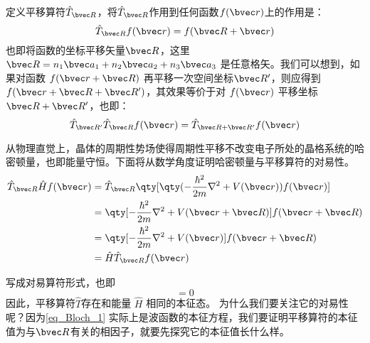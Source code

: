 定义平移算符$\hat{T}_{\bvec R}$，将$\hat{T}_{\bvec R}$作用到任何函数$f(\bvec r)$上的作用是：
\begin{equation}
\hat{T}_{\bvec R} f(\bvec r) = f(\bvec R + \bvec r)
\end{equation}
也即将函数的坐标平移矢量$\bvec R$，这里$\bvec R = n_1 \bvec a_1 + n_2 \bvec a_2 + n_3 \bvec a_3 $ 是任意格矢。我们可以想到，如果对函数 $f(\bvec r + \bvec R)$ 再平移一次空间坐标$\bvec R'$，则应得到$f(\bvec r + \bvec R + \bvec R')$，其效果等价于对 $f(\bvec r)$ 平移坐标$\bvec R + \bvec R'$，也即：
\begin{equation}
\hat{T}_{\bvec R'}\hat{T}_{\bvec R} f(\bvec r) = \hat{T}_{\bvec R + \bvec R'}f(\bvec r )
\end{equation}

从物理直觉上，晶体的周期性势场使得周期性平移不改变电子所处的晶格系统的哈密顿量，也即能量守恒。下面将从数学角度证明哈密顿量与平移算符的对易性。
\begin{equation}
\begin{aligned}
\hat{T}_{\bvec R} \hat{H} f(\bvec r) &= \hat{T}_{\bvec R} \qty[\qty(-\frac{\hbar^2}{2m}\nabla^2+V(\bvec r) ) f(\bvec r)] \\
&= \qty[-\frac{\hbar^2}{2m}\nabla^2+V(\bvec r + \bvec R)]  f(\bvec r + \bvec R)\\
&= \qty[-\frac{\hbar^2}{2m}\nabla^2+V(\bvec r) ] f(\bvec r+ \bvec R)\\
& = \hat{H} \hat{T}_{\bvec R} f(\bvec r)
\end{aligned}
\end{equation}

写成对易算符形式，也即
\begin{equation}
[\hat{T},\hat{H}] = 0
\end{equation}
因此，平移算符$\hat{T}$存在和能量 $\hat{H}$ 相同的本征态。
为什么我们要关注它的对易性呢？因为\autoref{eq_Bloch_1} 实际上是波函数的本征方程，我们要证明平移算符的本征值为与$\bvec R$有关的相因子，就要先探究它的本征值长什么样。

